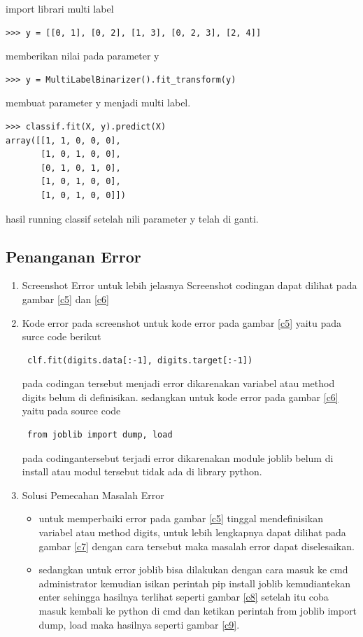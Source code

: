 \begin{enumerate}
\begin{itemize}
import librari multi label
\begin{verbatim}
>>> y = [[0, 1], [0, 2], [1, 3], [0, 2, 3], [2, 4]]
\end{verbatim}
memberikan nilai pada parameter y
\begin{verbatim}
>>> y = MultiLabelBinarizer().fit_transform(y)
\end{verbatim}
membuat parameter y menjadi multi label.
\begin{verbatim}
>>> classif.fit(X, y).predict(X)
array([[1, 1, 0, 0, 0],
       [1, 0, 1, 0, 0],
       [0, 1, 0, 1, 0],
       [1, 0, 1, 0, 0],
       [1, 0, 1, 0, 0]])
\end{verbatim}
hasil running classif setelah nili parameter y telah di ganti.
\end{itemize}
\end{enumerate}



\subsection{Penanganan Error}\par
\begin{enumerate}
\item
Screenshot Error
untuk lebih jelasnya Screenshot codingan dapat dilihat pada gambar \ref{c5} dan \ref{c6}
\item
Kode error pada screenshot
untuk kode error pada gambar \ref{c5} yaitu pada surce code berikut \begin{verbatim} clf.fit(digits.data[:-1], digits.target[:-1]) \end{verbatim} pada codingan tersebut menjadi error dikarenakan variabel atau method digits belum di definisikan.
sedangkan untuk kode error pada gambar \ref{c6} yaitu pada source code \begin{verbatim} from joblib import dump, load \end{verbatim}  pada codingantersebut terjadi error dikarenakan  module joblib belum di install atau modul tersebut tidak ada di library python.
\item
Solusi Pemecahan Masalah Error 
\begin{itemize}
\item
untuk memperbaiki error pada gambar \ref{c5} tinggal mendefinisikan variabel atau method digits, untuk lebih lengkapnya dapat dilihat pada gambar  \ref{c7} dengan cara tersebut maka masalah error dapat diselesaikan.
\item
sedangkan untuk error joblib bisa dilakukan dengan cara masuk ke cmd administrator kemudian isikan perintah pip install joblib kemudiantekan enter sehingga hasilnya terlihat seperti gambar \ref{c8} setelah itu coba masuk kembali ke python di cmd dan ketikan perintah from joblib import dump, load maka hasilnya seperti gambar \ref{c9}.
\end{itemize}
\end{enumerate}

